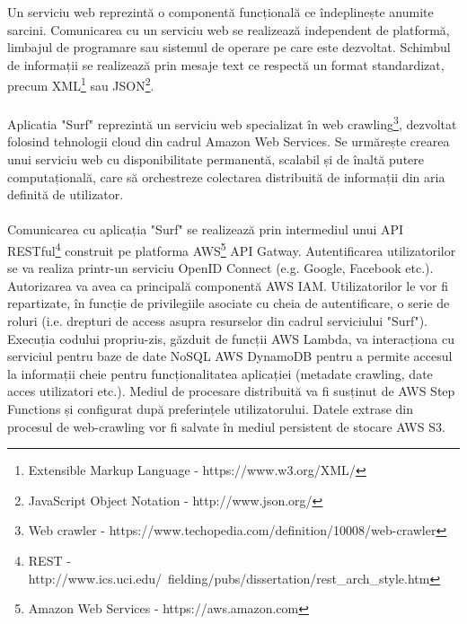 \newcommand{\xmlDescription}{Extensible Markup Language - https://www.w3.org/XML/}
\newcommand{\jsonDescription}{JavaScript Object Notation - http://www.json.org/}
\newcommand{\crawlDescription}{Web crawler - https://www.techopedia.com/definition/10008/web-crawler}
\newcommand{\restDescription}{REST - http://www.ics.uci.edu/~fielding/pubs/dissertation/rest\_arch\_style.htm}
\newcommand{\awsDescription}{Amazon Web Services - https://aws.amazon.com}

Un serviciu web reprezintă o componentă funcțională ce îndeplinește anumite sarcini. Comunicarea cu un serviciu web se realizează independent de platformă, limbajul de programare sau sistemul de operare pe care este dezvoltat. Schimbul de informații se realizează prin mesaje text ce respectă un format standardizat, precum XML\footnote{\xmlDescription} sau JSON\footnote{\jsonDescription}. 
\\
\\
Aplicatia "Surf" reprezintă un serviciu web specializat în web crawling\footnote{\crawlDescription}, dezvoltat folosind tehnologii cloud din cadrul Amazon Web Services. Se urmărește crearea unui serviciu web cu disponibilitate permanentă, scalabil și de înaltă putere computațională, care să orchestreze colectarea distribuită de informații din aria definită de utilizator.
\\
\\
Comunicarea cu aplicația "Surf" se realizează prin intermediul unui API RESTful\footnote{\restDescription} construit pe platforma AWS\footnote{\awsDescription} API Gatway. Autentificarea utilizatorilor se va realiza printr-un serviciu OpenID Connect (e.g. Google, Facebook etc.). Autorizarea va avea ca principală componentă AWS IAM. Utilizatorilor le vor fi repartizate, în funcție de privilegiile asociate cu cheia de autentificare, o serie de roluri (i.e. drepturi de access asupra resurselor din cadrul serviciului "Surf"). Execuția codului propriu-zis, găzduit de funcții AWS Lambda, va interacționa cu serviciul pentru baze de date NoSQL AWS DynamoDB pentru a permite accesul la informații cheie pentru funcționalitatea aplicației (metadate crawling, date acces utilizatori etc.). Mediul de procesare distribuită va fi susținut de AWS Step Functions și configurat după preferințele utilizatorului. Datele extrase din procesul de web-crawling vor fi salvate în mediul persistent de stocare AWS S3.
